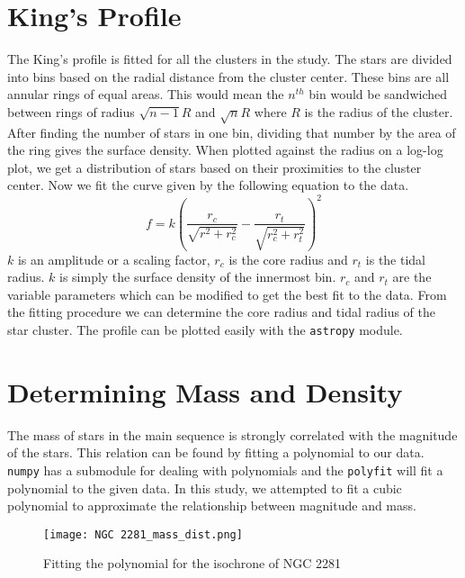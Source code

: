 \section{King's Profile}
The King's profile\citep{kingprofile} is fitted for all the clusters in the study. The stars are divided into bins based on the radial distance from the cluster center. These bins are all annular rings of equal areas. This would mean the $n^{th}$ bin would be sandwiched between rings of radius $\sqrt{n-1}R$ and $\sqrt{n}R$ where $R$ is the radius of the cluster. After finding the number of stars in one bin, dividing that number by the area of the ring gives the surface density. When plotted against the radius on a log-log plot, we get a distribution of stars based on their proximities to the cluster center. Now we fit the curve given by the following equation to the data.
$$f = k \left( \frac{r_c}{\sqrt{r^2+r_c^2}} - \frac{r_t}{\sqrt{r_c^2+r_t^2}} \right) ^2$$
$k$ is an amplitude or a scaling factor, $r_c$ is the core radius and $r_t$ is the tidal radius. $k$ is simply the surface density of the innermost bin. $r_c$ and $r_t$ are the variable parameters which can be modified to get the best fit to the data. From the fitting procedure we can determine the core radius and tidal radius of the star cluster. The profile can be plotted easily with the \lstinline{astropy}\citep{astropy} module.

\section{Determining Mass and Density}
The mass of stars in the main sequence is strongly correlated with the magnitude of the stars. This relation can be found by fitting a polynomial to our data. \lstinline{numpy} {}has a submodule for dealing with polynomials and the \lstinline{polyfit} {}will fit a polynomial to the given data. In this study, we attempted to fit a cubic polynomial to approximate the relationship between magnitude and mass. 

\begin{figure}[h]
	\centering
	\texttt{[image: NGC 2281\_mass\_dist.png]}
	\caption{Fitting the polynomial for the isochrone of NGC 2281}
	\label{fig:image_n}
\end{figure}



